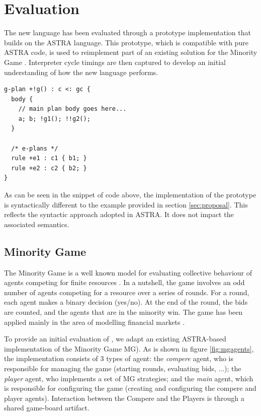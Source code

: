 \section{Evaluation}
\label{sec:evaluation}
The new language has been evaluated through a prototype implementation that builds on 
the ASTRA \cite{DBLP:conf/prima/CollierRL15} language. This prototype, which is compatible
with pure ASTRA code, is used to reimplement part of an existing solution for the Minority 
Game \cite{moro2004minority}. Interpreter cycle timings are then captured to develop an initial
understanding of how the new language performs.

{\small
\begin{verbatim}
g-plan +!g() : c <: gc { 
  body {
    // main plan body goes here...
    a; b; !g1(); !!g2();
  }

  /* e-plans */
  rule +e1 : c1 { b1; }
  rule +e2 : c2 { b2; }
}
\end{verbatim}}

As can be seen in the  snippet of code above, the implementation of the {\aser} prototype is 
syntactically different to the example provided in section \ref{sec:proposal}. This reflects 
the syntactic approach adopted in ASTRA. It does not impact the associated semantics.

\subsection{Minority Game}
\label{minority}
The Minority Game is a well known model for evaluating collective behaviour of agents competing 
for finite resources \cite{moro2004minority}. In a nutshell, the game involves an odd number of
agents competing for a resource over a series of rounds. For a round, each agent makes a binary
decision (yes/no). At the end of the round, the bids are counted, and the agents that are in the
minority win. The game has been applied mainly in the area of modelling financial markets \cite{??}.

To provide an initial evaluation of {\aser}, we adapt an existing ASTRA-based implementation of 
the Minority Game MG). As is shown in figure \ref{fig:mgagents}, the implementation consists of
3 types of agent: the \emph{compere} agent, who is responsible for managing the game (starting 
rounds, evaluating bids, ...); the \emph{player} agent, who implements a set of MG strategies; 
and the \emph{main} agent, which is responsible for configuring the game (creating and configuring
the compere and player agents). Interaction between the Compere and the Players is through a shared 
game-board artifact.

